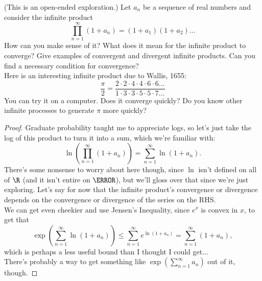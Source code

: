\documentclass{assignment}
\begin{document}
\begin{question}[4]
 (This is an open-ended exploration.) Let $a_n$ be a sequence of real numbers and consider the infinite
product $$\prod_{n=1}^\infty (1 + a_n) = (1 + a_1)(1 + a_2)\dots$$ How can you make sense of it? What 
does it mean for the infinite product to converge? Give examples of convergent and divergent infinite
products. Can you find a necessary condition for convergence? \\

Here is an interesting infinite product due to Wallis, 1655: $$\frac{\pi}{2} =
 \frac{2 \cdot 2\cdot  4 \cdot 4 \cdot 6 \cdot 6 \dots}{1 \cdot 3 \cdot 3 \cdot 5 \cdot 5 \cdot 7 \dots}$$
You can try it on a computer. Does it converge quickly? Do you know other infinite processes to generate 
$\pi$ more quickly?
\end{question}
\begin{proof}
  Graduate probability taught me to appreciate logs, so let's just take the log of this product to
  turn it into a sum, which we're familiar with:
  $$\ln \left( \prod_{n=1}^\infty (1 + a_n) \right) = \sum_{n=1}^\infty \ln(1+a_n).$$ There's some
  nonsense to worry about here though, since $\ln$ isn't defined on all of $\R$ (and it isn't
  entire on $\C$), but we'll gloss over that since we're just exploring. Let's say for now that the
  infinite product's convergence or divergence depends on the convergence or divergence of the
  series on the RHS.\\

  We can get even cheekier and use Jensen's Inequality, since $e^x$ is convex in $x$, to get that 
  $$\exp\left(\sum_{n=1}^\infty \ln(1 + a_n)\right) \leq \sum_{n=1}^\infty e^{\ln(1 + a_n)} = 
  \sum_{n=1}^\infty (1 + a_n),$$ which is perhaps a less useful bound than I thought I could get...
  \\

  There's probably a way to get something like $\exp \left( \sum_{n=1}^\infty a_n \right)$ out of
  it, though.

\end{proof}
\end{document}

